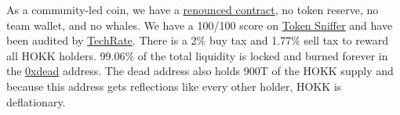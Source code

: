 \documentclass{article}
\begin{document}
As a community-led coin, we have a \href{https://etherscan.io/tx/0x06ca2f1e4203da09f8ac48351c726af638fa018b9078f24878fc5838ce9c01c4}{renounced contract}, no token reserve, no team wallet, and no whales. We have a 100/100 score on \href{https://tokensniffer.com/token/eth/b4sx59z86ppaszdabzp9xp1bafkdj9ljqhf2bi2mgvjc0q0o2n4a4es0kbsa}{Token Sniffer} and have been audited by \href{https://github.com/TechRate/Smart-Contract-Audits/blob/main/2018-21%20A-M/Hokkaidu%20Inu.pdf}{TechRate}. There is a 2\% buy tax and 1.77\% sell tax to reward all HOKK holders. 99.06\% of the total liquidity is locked and burned forever in the \href{https://etherscan.io/address/0x000000000000000000000000000000000000dead}{0xdead} address. The dead address also holds 900T of the HOKK supply and because this address gets reflections like every other holder, HOKK is deflationary.

\newpage
\end{document}
